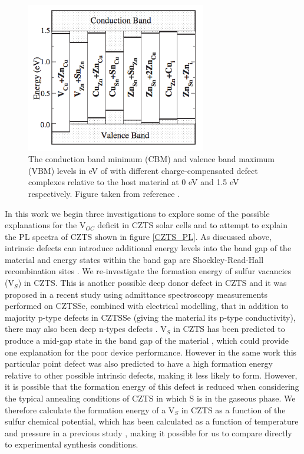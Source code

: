 \begin{figure}[h!]
  \centering
    \includegraphics[width=0.7\textwidth]{figures/Chen_cluster_E-level.png}
    \caption{The conduction band minimum (CBM) and valence band maximum (VBM) levels in eV of \CZTS with different charge-compensated defect complexes relative to the host material at 0 eV and 1.5 eV respectively. Figure taken from reference . }
  \label{Chen_cluster2}
\end{figure}

In this work we begin three investigations to explore some of the possible explanations for the V$_{OC}$ deficit in CZTS solar cells and to attempt to explain the PL spectra of CZTS shown in figure \ref{CZTS_PL}. 
As discussed above, intrinsic defects can introduce additional energy levels into the band gap of the material and energy states within the band gap are Shockley-Read-Hall recombination sites \cite{SRH}.
We re-investigate the formation energy of sulfur vacancies (V$_S$) in CZTS. This is another possible deep donor defect in CZTS and it was proposed in a recent study using admittance spectroscopy measurements performed on CZTSSe, combined with electrical modelling, that in addition to majority p-type defects in CZTSSe (giving the material its p-type conductivity), there may also been deep n-types defects \cite{CZTS_n-type}.
V$_S$ in CZTS has been predicted to produce a mid-gap state in the band gap of the material \cite{defect1}, which could provide one explanation for the poor device performance. However in the same work this particular point defect was also predicted to have a high formation energy relative to other possible intrinsic defects, making it less likely to form. However, it is possible that the formation energy of this defect is reduced when considering the typical annealing conditions of CZTS in which S is in the gaseous phase. We therefore calculate the formation energy of a V$_S$ in CZTS as a function of the sulfur chemical potential, which has been calculated as a function of temperature and pressure in a previous study \cite{Adam_sulfur}, making it possible for us to compare directly to experimental synthesis conditions.\\

